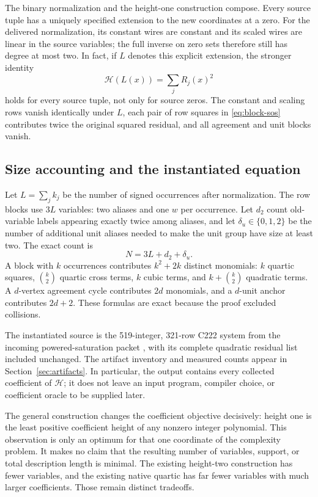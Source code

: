 The binary normalization and the height-one construction compose. Every
source tuple has a uniquely specified extension to the new coordinates
at a zero. For the delivered normalization, its constant wires are
constant and its scaled wires are linear in the source variables; the
full inverse on zero sets therefore still has degree at most two.
In fact, if $L$ denotes this explicit extension, the stronger identity
\begin{equation}
 \mathcal H(L(x))=\sum_j R_j(x)^2
 \label{eq:forward-value}
\end{equation}
holds for every source tuple, not only for source zeros. The constant
and scaling rows vanish identically under $L$, each pair of row squares
in \eqref{eq:block-sos} contributes twice the original squared residual,
and all agreement and unit blocks vanish.

\subsection{Size accounting and the instantiated equation}

Let $L=\sum_j k_j$ be the number of signed occurrences after normalization.
The row blocks use $3L$ variables: two aliases and one $w$ per occurrence.
Let $d_2$ count old-variable labels appearing exactly twice among aliases,
and let $\delta_u\in\{0,1,2\}$ be the number of additional unit aliases
needed to make the unit group have size at least two. The exact count is
\begin{equation}
 N=3L+d_2+\delta_u.
 \label{eq:height-count}
\end{equation}
A block with $k$ occurrences contributes $k^2+2k$ distinct monomials:
$k$ quartic squares, $\binom{k}{2}$ quartic cross terms, $k$ cubic terms,
and $k+\binom{k}{2}$ quadratic terms. A $d$-vertex agreement cycle
contributes $2d$ monomials, and a $d$-unit anchor contributes $2d+2$.
These formulas are exact because the proof excluded collisions.

The instantiated source is the 519-integer, 321-row C222 system from
the incoming powered-saturation packet \cite{round14}, with its complete
quadratic residual list included unchanged. The artifact inventory and
measured counts appear in Section~\ref{sec:artifacts}. In particular,
the output contains every collected coefficient of $\mathcal H$; it
does not leave an input program, compiler choice, or coefficient oracle
to be supplied later.

The general construction changes the coefficient objective decisively:
height one is the least positive coefficient height of any nonzero
integer polynomial. This observation is only an optimum for that one
coordinate of the complexity problem. It makes no claim that the
resulting number of variables, support, or total description length is
minimal. The existing height-two construction \cite{heighttwo} has fewer
variables, and the existing native quartic has far fewer variables with
much larger coefficients. Those remain distinct tradeoffs.

